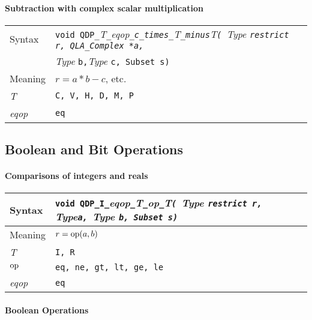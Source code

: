 \documentclass{article}
\newcommand{\op}{\mathop{\rm op}}
\newcommand{\tqlaComplex}{QLA\ttdash Complex }
\newcommand{\namespace}{QDP}
\newcommand{\ttdash}{{\tt \_}}
\newcommand{\itt}{\it T}
\newcommand{\extraarg}{, Subset s}
\begin{document}
\paragraph{Subtraction with complex scalar multiplication}

\begin{flushleft}
  \begin{tabular}{|l|l|}
  \hline
  Syntax      & {\tt void \namespace}\ttdash\itt\ttdash{\it eqop}\ttdash{\tt c}\ttdash{\tt times}\ttdash\itt\ttdash{\tt minus}\itt{\tt ( }{\it Type }{\tt *restrict r, }{\tt \tqlaComplex *a, }\\
              & {\it Type }{\tt *b,}{\it Type }{\tt *c\extraarg)} \\
  \hline
  Meaning     & $r = a * b - c$, etc. \\
  \hline
  \itt        & {\tt C, V, H, D, M, P} \\
  \hline
  {\it eqop}  & {\tt eq} \\
  \hline
  \end{tabular}
\end{flushleft}

\subsection{Boolean and Bit Operations}
\paragraph{Comparisons of integers and reals}

\begin{flushleft}
  \begin{tabular}{|l|l|}
  \hline
  Syntax      & {\tt void \namespace}\ttdash{\tt I}\ttdash{\it eqop}\ttdash\itt\ttdash{\it op}\ttdash\itt{\tt ( }{\it Type }{\tt *restrict r, } {\it Type}{\tt *a, }{\it Type }{\tt *b\extraarg)} \\
  \hline
  Meaning     & $r = \op(a,b)$ \\
  \hline
  \itt        & {\tt I, R} \\
  \hline
  $\op$       & {\tt eq, ne, gt, lt, ge, le} \\
  \hline
  {\it eqop}  & {\tt eq} \\
  \hline
  \end{tabular}
\end{flushleft}

\paragraph{Boolean Operations}
\end{document}
